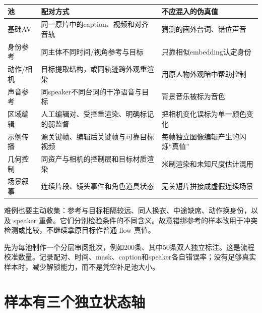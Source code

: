 {\def\LTcaptype{table} %
\small\setlength{\tabcolsep}{3pt}\renewcommand{\arraystretch}{1.18}
\begin{longtable}[]{@{}
  >{\raggedright\arraybackslash}p{}
  >{\raggedright\arraybackslash}p{}
  >{\raggedright\arraybackslash}p{}@{}}
\toprule\noalign{}
\begin{minipage}[b]{\linewidth}\raggedright
池
\end{minipage} & \begin{minipage}[b]{\linewidth}\raggedright
配对方式
\end{minipage} & \begin{minipage}[b]{\linewidth}\raggedright
不应混入的伪真值
\end{minipage} \\
\midrule\noalign{}
\endhead
\bottomrule\noalign{}
\endlastfoot
基础AV & 同一原片中的caption、视频和对齐音轨 & 猜测的画外台词、错位声音 \\
身份参考 & 同主体不同时间/视角参考与目标 & 只靠相似embedding认定身份 \\
动作/相机 & 目标提取结构，或同轨迹跨外观重渲染 & 用原人物外观暗中帮助控制 \\
声音参考 & 同speaker不同台词的干净语音与目标 & 背景音乐被标为音色 \\
区域编辑 & 人工编辑对、受控重渲染、明确标记的弱监督 & 把相机变化误标为单一颜色变化 \\
示例传播 & 源关键帧、编辑后关键帧与可靠目标视频 & 每帧独立图像编辑产生的闪烁``真值'' \\
几何控制 & 同资产与相机的控制层和目标材质渲染 & 米制渲染和未知尺度估计混用 \\
场景叙事 & 连续片段、镜头事件和角色道具状态 & 无关短片拼接成虚假连续场景 \\
\end{longtable}
}

难例也要主动收集：参考与目标相隔较远、同人换衣、中途缺席、动作换身份，以及 speaker 重叠。它们分别检验条件的不同含义。故意错绑参考的样本改用于冲突检测或比较，不继续拿原目标作普通 flow 真值。

先为每池制作一个分层审阅批次，例如200条、其中50条双人独立标注。这是流程校准数量。记录配对、时间、mask、caption和speaker各自错误率；没有足够真实样本时，减少解锁能力，而不是凭空补足池大小。

\section{样本有三个独立状态轴}\label{seedance-m25-ux6837ux672cux6709ux4e09ux4e2aux72ecux7acbux72b6ux6001ux8f74}

